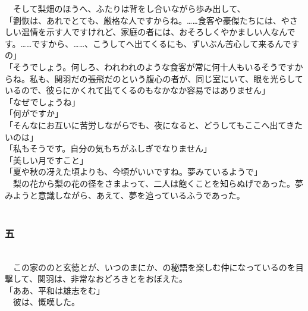 \documentclass[
  paper=a5,
  fontsize=10pt,
  jafontsize=9.5pt,
  tate,                  %
  open_bracket_pos=nibu, %
]{jlreq}
\begin{document}
　そして梨畑のほうへ、ふたりは背をし合いながら歩み出して、\\


「劉恢は、あれでとても、厳格な人ですからね。……食客や豪傑たちには、やさしい温情を示す人ですけれど、家庭の者には、おそろしくやかましい人なんです。……ですから、……、こうしてへ出てくるにも、ずいぶん苦心して来るんですの」\\


「そうでしょう。何しろ、われわれのような食客が常に何十人もいるそうですからね。私も、関羽だの張飛だのという腹心の者が、同じ室にいて、眼を光らしているので、彼らにかくれて出てくるのもなかなか容易ではありません」\\


「なぜでしょうね」\\


「何がですか」\\


「そんなにお互いに苦労しながらでも、夜になると、どうしてもここへ出てきたいのは」\\


「私もそうです。自分の気もちがふしぎでなりません」\\


「美しい月ですこと」\\


「夏や秋の冴えた頃よりも、今頃がいいですね。夢みているようで」\\


　梨の花から梨の花の径をさまよって、二人は飽くことを知らぬげであった。夢みようと意識しながら、あえて、夢を追っているふうであった。\\

\\

\subsubsection{五}

\\


　この家ののと玄徳とが、いつのまにか、の秘語を楽しむ仲になっているのを目撃して、関羽は、非常なおどろきとをおぼえた。\\


「ああ、平和は雄志をむ」\\


　彼は、慨嘆した。\\
\end{document}
